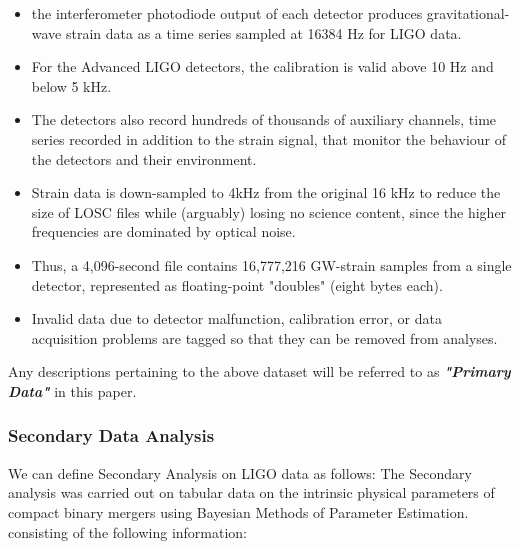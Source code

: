     \begin{itemize}
        \item the interferometer photodiode output of each detector produces gravitational-wave strain data as a time series sampled at 16384 Hz for LIGO data.
        \item For the Advanced LIGO detectors, the calibration is valid above 10 Hz and below 5 kHz.
        \item The detectors also record hundreds of thousands of auxiliary channels, time series recorded in addition to the strain signal, that monitor the behaviour of the detectors and their environment.
        \item Strain data is down-sampled to 4kHz from the original 16 kHz to reduce the size of LOSC files while (arguably) losing no science content, since the higher frequencies are dominated by
        optical noise.
        \item Thus, a 4,096-second file contains 16,777,216 GW-strain samples from a single
        detector, represented as floating-point "doubles" (eight bytes each).
        \item Invalid data due to detector malfunction, calibration error, or data acquisition problems are
    tagged so that they can be removed from analyses.

    \end{itemize}

    Any descriptions pertaining to the above dataset will be referred to as \textbf{\textit{"Primary Data"}} in this paper.

    \subsubsection{Secondary Data Analysis}
    We can define Secondary Analysis on LIGO data as follows:
    The Secondary analysis was carried out on tabular data  on the intrinsic physical parameters of compact binary mergers using Bayesian Methods of Parameter Estimation. \cite{00.7_LIGOBayesianAnalysis} \cite{00.6_LIGOAnalysisPipeline} \cite{24.4_CompactBinaryParameterEstimates} \cite{24.5_GWParameterEsitmation} \cite{24.6_LIGOParameterEstimates} consisting of the following information:

